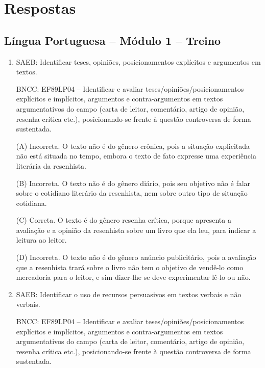 \chapter{Respostas}
\pagestyle{plain}
\footnotesize

\pagecolor{gray!40}

\section*{Língua Portuguesa – Módulo 1 – Treino}

\begin{enumerate}
\item

SAEB: Identificar teses, opiniões, posicionamentos explícitos e
argumentos em textos.

BNCC: EF89LP04 -- Identificar e avaliar
teses/opiniões/posicionamentos explícitos e implícitos, argumentos e
contra-argumentos em textos argumentativos do campo (carta de leitor,
comentário, artigo de opinião, resenha crítica etc.), posicionando-se
frente à questão controversa de forma sustentada.

(A) Incorreta. O texto não é do gênero crônica, pois a situação
explicitada não está situada no tempo, embora o texto de fato expresse
uma experiência literária da resenhista. 

(B) Incorreta. O texto não é do gênero diário, pois seu objetivo não é falar sobre o cotidiano literário da resenhista, nem sobre outro tipo de situação cotidiana. 

(C) Correta. O texto é do gênero resenha crítica, porque apresenta a avaliação e a opinião da resenhista sobre um livro que ela leu, para indicar a leitura ao leitor. 

(D) Incorreta. O texto não é do gênero anúncio publicitário,
pois a avaliação que a resenhista trará sobre o livro não tem o objetivo
de vendê-lo como mercadoria para o leitor, e sim dizer-lhe se deve
experimentar lê-lo ou não.

\item
SAEB: Identificar o uso de recursos persuasivos em textos verbais e não
verbais. 

BNCC: EF89LP04 -- Identificar e avaliar
teses/opiniões/posicionamentos explícitos e implícitos, argumentos e
contra-argumentos em textos argumentativos do campo (carta de leitor,
comentário, artigo de opinião, resenha crítica etc.), posicionando-se
frente à questão controversa de forma sustentada.


\end{enumerate}
